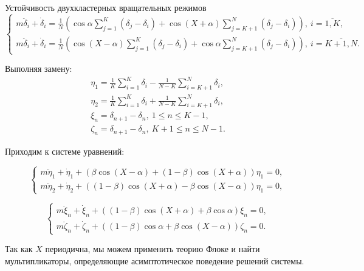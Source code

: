 \begin{chapter}{Устойчивость двухкластерных вращательных режимов}
	\begin{equation}
		\begin{cases}
			m\ddot{\delta}_i + \dot{\delta}_i = \frac{1}{N} \left( \cos{\alpha} \sum_{j = 1}^K (\delta_j - \delta_i) + \cos{(X + \alpha)} \sum_{j = K + 1}^N (\delta_j - \delta_i) \right), \ i = \overline{1,K}, \\
			m\ddot{\delta}_i + \dot{\delta}_i = \frac{1}{N} \left( \cos{(X - \alpha)} \sum_{j = 1}^K (\delta_j - \delta_i) +  \cos{\alpha} \sum_{j = K + 1}^N (\delta_j - \delta_i)  \right), \ i = \overline{K + 1,N}.
		\end{cases}		
	\end{equation}
	
	Выполняя замену:
	\begin{align*}
		\eta_1 = \frac{1}{K} \sum_{i = 1}^K \delta_i - \frac{1}{N - K} \sum_{i = K + 1}^N \delta_i, \\
		\eta_2 = \frac{1}{K} \sum_{i = 1}^K \delta_i + \frac{1}{N - K} \sum_{i = K + 1}^N \delta_i, \\
		\xi_n = \delta_{n+1} - \delta_n, \ 1 \leq  n \leq K - 1, \\
		\zeta_n = \delta_{n+1} - \delta_n, \ K + 1 \leq n \leq N - 1.
	\end{align*}
		
	Приходим к системе уравнений:
	
	\begin{equation} \label{split-linear-pert-sys-n12}
		\begin{cases}
			m\ddot{\eta}_1 + \dot{\eta}_1 + \left( \beta \cos{(X - \alpha)} + (1 - \beta) \cos{(X + \alpha)} \right) \eta_1 = 0, \\
			m\ddot{\eta}_2 + \dot{\eta}_2 + \left( (1 - \beta) \cos{(X + \alpha)} - \beta \cos{(X - \alpha)} \right) \eta_1 = 0,
		\end{cases}
	\end{equation}
	
	
	\begin{equation} \label{split-linear-pert-sys-ksi-eta}
		\begin{cases}
			m\ddot{\xi}_n + \dot{\xi}_n + \left( (1 - \beta) \cos{(X + \alpha)} + \beta \cos{\alpha} \right) \xi_n = 0, \\
			m\ddot{\zeta}_n + \dot{\zeta}_n + \left( (1 - \beta) \cos{\alpha} + \beta \cos{(X - \alpha)} \right) \zeta_n = 0.
		\end{cases}
	\end{equation}
	
	Так как $X$ периодична, мы можем применить теорию Флоке
	и найти мультипликаторы, определяющие асимптотическое поведение решений системы.
	

\end{chapter}
